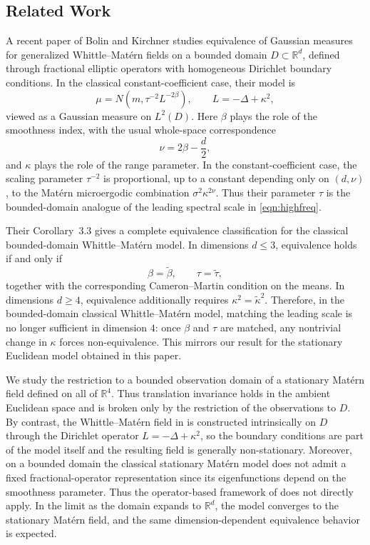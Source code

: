 \documentclass[11pt, reqno]{amsart}
\theoremstyle{remark}
\newcommand{\R}{\mathbb{R}}
\newcommand{\1}{\mathbf{1}}
\begin{document}
\subsection{Related Work}

A recent paper of Bolin and Kirchner \cite{BoliKirc2023} studies equivalence of
Gaussian measures for generalized Whittle--Mat\'ern fields on a bounded domain
$D\subset \R^d$, defined through fractional elliptic operators with homogeneous
Dirichlet boundary conditions. In the classical constant-coefficient case, their
model is
\[
\mu = N(m,\tau^{-2}L^{-2\beta}),
\qquad
L=-\Delta+\kappa^2,
\]
viewed as a Gaussian measure on $L^2(D)$. Here $\beta$ plays the role of the
smoothness index, with the usual whole-space correspondence
\[
\nu = 2\beta-\frac d2,
\]
and $\kappa$ plays the role of the range parameter. In the constant-coefficient
case, the scaling parameter $\tau^{-2}$ is proportional, up to a constant
depending only on $(d,\nu)$, to the Mat\'ern microergodic combination
$\sigma^2\kappa^{2\nu}$. Thus their parameter $\tau$ is the bounded-domain
analogue of the leading spectral scale in \eqref{eqn:highfreq}.

Their Corollary~3.3 gives a complete equivalence classification for the classical
bounded-domain Whittle--Mat\'ern model. In dimensions $d\le 3$, equivalence
holds if and only if
\[
\beta=\tilde\beta,
\qquad
\tau=\tilde\tau,
\]
together with the corresponding Cameron--Martin condition on the means. In
dimensions $d\ge 4$, equivalence additionally requires
$
\kappa^2=\tilde\kappa^2.
$
Therefore, in the bounded-domain classical Whittle--Mat\'ern model, matching the
leading scale is no longer sufficient in dimension $4$: once $\beta$ and $\tau$
are matched, any nontrivial change in $\kappa$ forces non-equivalence. This mirrors our result for 
the stationary Euclidean model obtained in this paper.

We study the restriction to a bounded observation domain of a stationary
Mat\'ern field defined on all of $\R^4$. Thus translation invariance holds in
the ambient Euclidean space and is broken only by the restriction of the
observations to $D$. By contrast, the Whittle--Mat\'ern field in
\cite{BoliKirc2023} is constructed intrinsically on $D$ through the Dirichlet
operator $L=-\Delta+\kappa^2$, so the boundary conditions are part of the model
itself and the resulting field is generally non-stationary. Moreover, on a
bounded domain the classical stationary Mat\'ern model does not admit a fixed
fractional-operator representation since its eigenfunctions depend on the smoothness
parameter. Thus the operator-based framework of \cite{BoliKirc2023} does not
directly apply. In the limit as the domain expands to $\R^d$, the model converges to the stationary Mat\'ern field, 
and the same dimension-dependent equivalence behavior is expected.
\end{document}

